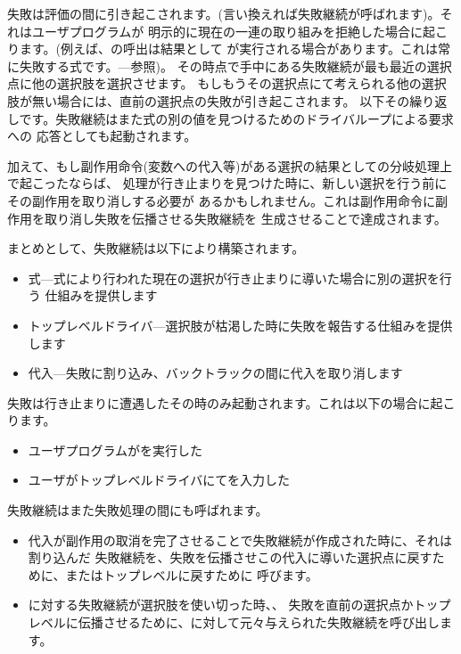 失敗は評価の間に引き起こされます。(言い換えれば失敗継続が呼ばれます)。それはユーザプログラムが
明示的に現在の一連の取り組みを拒絶した場合に起こります。(例えば、の呼出は結果として
が実行される場合があります。これは常に失敗する式です。---参照)。
その時点で手中にある失敗継続が最も最近の選択点に他の選択肢を選択させます。
もしもうその選択点にて考えられる他の選択肢が無い場合には、直前の選択点の失敗が引き起こされます。
以下その繰り返しです。失敗継続はまた式の別の値を見つけるためのドライバループによる要求への
応答としても起動されます。


加えて、もし副作用命令(変数への代入等)がある選択の結果としての分岐処理上で起こったならば、
処理が行き止まりを見つけた時に、新しい選択を行う前にその副作用を取り消しする必要が
あるかもしれません。これは副作用命令に副作用を取り消し失敗を伝播させる失敗継続を
生成させることで達成されます。


まとめとして、失敗継続は以下により構築されます。

\begin{itemize}

\item
{}式---式により行われた現在の選択が行き止まりに導いた場合に別の選択を行う
仕組みを提供します

\item
トップレベルドライバ---選択肢が枯渇した時に失敗を報告する仕組みを提供します

\item
代入---失敗に割り込み、バックトラックの間に代入を取り消します

\end{itemize}

\noindent
失敗は行き止まりに遭遇したその時のみ起動されます。これは以下の場合に起こります。

\begin{itemize}

\item
ユーザプログラムがを実行した

\item
ユーザがトップレベルドライバにてを入力した

\end{itemize}

\noindent
失敗継続はまた失敗処理の間にも呼ばれます。

\begin{itemize}

\item
代入が副作用の取消を完了させることで失敗継続が作成された時に、それは割り込んだ
失敗継続を、失敗を伝播させこの代入に導いた選択点に戻すために、またはトップレベルに戻すために
呼びます。

\item
{}に対する失敗継続が選択肢を使い切った時、、
失敗を直前の選択点かトップレベルに伝播させるために、に対して元々与えられた失敗継続を呼び出します。

\end{itemize}

